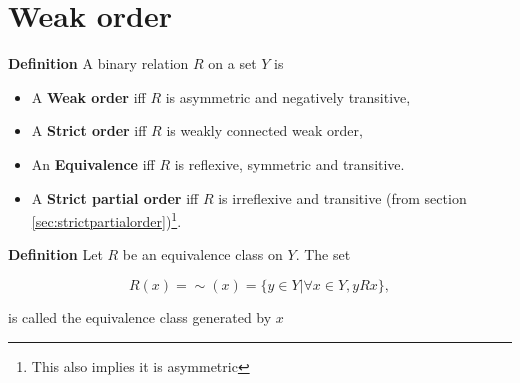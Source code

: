 \documentclass{article}
\theoremstyle{definition}
\begin{document}
\section{Weak order}

{\bf Definition} A binary relation $R$ on a set $Y$ is
\begin{itemize}
\item A {\bf Weak order} iff $R$ is asymmetric and negatively transitive,
\item A {\bf Strict order} iff $R$ is weakly connected weak order,
\item An \textbf{Equivalence} iff $R$ is reflexive, symmetric and transitive.
\item A {\bf Strict partial order} iff $R$ is irreflexive and transitive (from section \ref{sec:strictpartialorder})\footnote{This also implies it is asymmetric}.
\end{itemize}

{\bf Definition} Let $R$ be an equivalence class on $Y$. The set

\begin{equation*}
R(x)=\sim(x)=\{y\in Y| \forall x\in Y, yRx \},
\end{equation*}

is called the equivalence class generated by $x$
\end{document}

